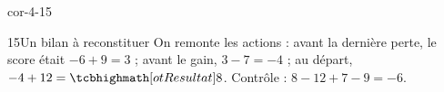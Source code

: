 \begin{blocLivre}{cor-4-15}\begin{corrige}{15}{Un bilan à reconstituer}
On remonte les actions : avant la dernière perte, le score était $-6+9=3$ ; avant le gain, $3-7=-4$ ; au départ, $-4+12=\res8$. Contrôle : $8-12+7-9=-6$.
\end{corrige}\end{blocLivre}
